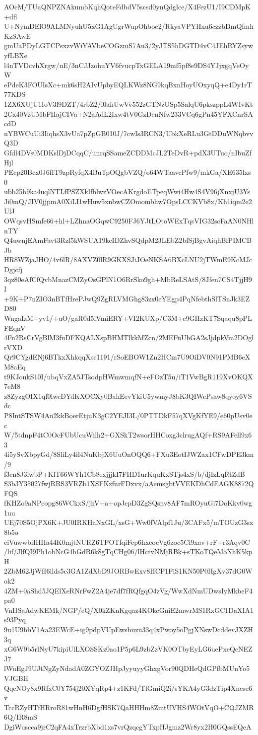 AOcM/TUaQNPZNAkumbKqhQoteFdbdV5scsd0ynQdglce/X4FezU1/I9CDMpK+dfl
U+NymDElO9ALMNyuhU5xG1AgUgrWupOhboc2/RkyaVPYHxu6czzbDmQfmhKzSAwE
gmUaPDyLGTCPsxzvWiYAVbeCOGzmS7Au3/2yJTS5hDGTD4vC4JEhRYZsywyfLBXe
l4nTVDcvhXrgw/uE/3nCJJzohuYV6fvucpTxGELA19mf5pf8e9DS4YJjxgqVeOyW
ePdeK3FOUIsXc+mk6sH2AIvUpbyEQLKWz8NG9kqBxnHoyUOxyqQ+e4Dy1rT77KDS
1ZX6XUjU1IoV3l9DZT/4rbZ2/i0ahUwVv552zGTNzUSp5SalqU6pkszppL4WIvKt
2Cx40VzUMbFHajCIVa+N2aAdL2Ixw4tV0GzDenNfw233VCq6gPn45YFXCnrSAcdD
nYBWCuUi3IiqhsX3vUa7pZpGB010J/7cwIs3RCN3/UbkXeRLu3GtDDuWNqbvvQ3D
Gfdl4DVs0MDKslDjDCqqC/unrqSSameZCDDMcJL2TeDvR+pdX3UTuo/nIbuZfHjl
PEcp20Bcx0J6fIT9zpRyfqX4BuTpOQgbVZQ/o64WTaavcPfw9/mkGa/XE635lxs0
ubb25h9ka4uqlNTLfPSZXklfblwzVOecAKrgdoETpeqWwi4Hw4S4V96jXnxjU3Ys
Ji0mQ/JIV0jjpmA0XiLI1wHuw5xnbwCZOmombhw7OpsLCCKVb8x/Kh1iqm2e2UlJ
OWqsvHSmfe66+hl+LZhnaOGqwC9250FJ6YJtLOtoWExTqsVIG32scFaAN0NHlnTY
Q4uwnjEAmFavt3Rzl5kWSUA19kcIDZhvSQdpM23LEbZ2bfSjBgvAiqhBfPIMCBJb
HR8WZjaJHO/4v6lR/8AXVZ0lR9GKXSJiJOeNKSA6BXcLNU2jTWmE9KcMJcDgjcfj
3qz80eAfCfQvbMnazCMZyOsGPlN1O6RrSko9gh+MbReLSAtS/8Jfen7CS4TjjH9I
+9K+P7nZIO3nBTfHrePJwQ9ZgRLVMGhg83zx0eYEgp4PqNfebthSlTSnJk3EZD80
WngaIzM+yv1/+uO/gaR0d5lVmiERY+VI2KUXp/C3M+c9GHzKT7Sqaqu8pPLFEqnV
4Fn2RsCrVgBlM3fuDFKQALXspBHMTlkkMZcn/2MEFuUbGA2sJjdpkVm2DOglrVXD
Qr9CYgdENj6BTkxXhkqqXsc1191/rSoEBOW1Zn2HCm7U9OiDV0N91PMB6eXM8aEq
t9KJoukS10I/ubqVxZA5JTsodpHWmwmqfN+eFOzT5u/iT1VwBgR119XvOKQX7eM8
z8ZyzgOIX1qf0lwcDYdKXOCXy0BahEevYkiU5ywmyJ8bK3QIWcPsaw8qyoy6VSdc
P8IntSTSW4An2kkBoerEtjuK3gC2YEJI3L/0PTTDkF57qXVgKfYE9/e60pUsv0ec
W/5tdnpF4tC0OcFUbUcuWilh2+GXSkT2wsorHHCoxg3clrugAQf+RS9AFell9x63
4i5ySvXbpyGd/8SliLy4il4NuKbjX6UuOnOQQ6+FXu3EotIJWZax1CFwDPE3km/9
f3cn8J3lwbP+KlT66WYh1Cb8exjjjkI7FHD1urKquKxSTjs4xS/b/djIzLqRtZdB
S3b3Y35027fwjRRS3VRZb1XSFKzfnrFDxvx/aAemsgbtVVEKDhCdEAGK8872QFQS
fKHZo9aNPcopg86WCkxS/jhV+a+opJcpD3ZgSQsnv8AF7mROyuGi7DoKkv0wg1uu
UEj70S5OjPX6K+JU0IRKHaNxGL/xsG+Ww0fVAlpf1Ju/3CAFx5/mTOUzG3sx8b5o
ciVuwwbiIHHa44K0mjtNURZ6TPOTfqiFcp6hxeocVg6zoc5Ci9xav+rF+r3Aqv0C
/lif/JlfQI9Ph1obNcG4hGdR6k8gTqCHg06/lHctvNMjRBk+sTKoTQeMoNhK5kpH
2ZbM62JjWfI6ilds5c3GA1ZdXbD9JORBwExv8HCP1FiS1KN50P0HgXv37dG0Wok2
4ZM+0aShd5JQElXeRNrFwZ2A4je7df7fRQfgqO4zVg/WwXdNmUDwsIyMkbeF4pa0
VnHSaAdwKEMk/NGP/eQ/X0kZKnKgqaz4KOkcGniE2mwrMS1RxGC1DaXIA1s93Pyq
9u1U9bbV1Aa23EWcE+ig9pdpVUpEwsbuzu33q4xPwoy5oPgjXNswDcddevJXZH3q
xG6W9b5rlNyU7kipiUlLXOSSKz0ao1P5p6L9zbZzVK0OTbyEyLG6uePxeQcNEZJ7
lWuEgJ9UJtNgZyNdadA0ZGYOZJHpJyyuyyGhxgVor90QDHeQdGPfbMUnYo5VJGBH
QqcNOy8x9RfxC0Y754j20XYqRp4+z1KFd/TlGmiQ2i/sYKA4yG3dzTip4Xncse6v
TccRZyHTfHRroR81wHnH6DgfHSK7QaHHHm8ZmtUVHS4WOtVqO+CQJZMR6Q/IR8mS
DgiWuscca9jrC2qFA4xTrzrbXbd1xs7vrQzqcgYTxpHJgmz2Wr8yx2H0GQssEQeA
